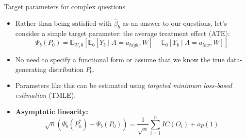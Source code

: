 \documentclass[12pt,t]{beamer}
\begin{document}
\begin{frame}[c]{Target parameters for complex questions}

\begin{center}
\begin{itemize}
  \itemsep12pt
  \item Rather than being satisfied with $\hat{\beta}_{b}$ as an answer to our
    questions, let's consider a simple target parameter: the average treatment
    effect (ATE):
    \[
      \Psi_b(P_0) = \mathbb{E}_{W,0}[\mathbb{E}_0[Y_b \mid A = a_{high}, W] -
      \mathbb{E}_0[Y_b \mid A = a_{low}, W]]
    \]
  \item No need to specify a functional form or assume that we know the true
    data-generating distribution $P_0$.
  \item Parameters like this can be estimated using \textit{targeted minimum
    loss-based estimation} (TMLE).
  \item \textbf{Asymptotic linearity:}
    \[
      \sqrt{n}(\Psi_b(P_n^*) - \Psi_b(P_0)) = \frac{1}{\sqrt{n}}
      \sum_{i = 1}^{n} IC(O_i) + o_P(1)
    \]
\end{itemize}
\end{center}

\end{frame}
\end{document}
